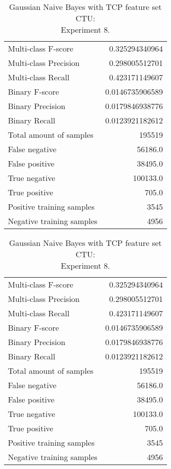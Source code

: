 \begin{table}[H]
\begin{minipage}{0.5\textwidth}
\caption{Gaussian Naive Bayes with TCP feature set CTU: \\Experiment 7.}
\centering
\begin{tabular}{l r}
\toprule
Multi-class F-score & 0.325294340964 \\
Multi-class Precision & 0.298005512701 \\
Multi-class Recall & 0.423171149607 \\
\midrule
Binary F-score & 0.0146735906589 \\
Binary Precision & 0.0179846938776 \\
Binary Recall & 0.0123921182612 \\
\midrule
Total amount of samples & 195519 \\
False negative & 56186.0 \\
False positive & 38495.0 \\
True negative & 100133.0 \\
True positive & 705.0 \\
\midrule
Positive training samples & 3545 \\
Negative training samples & 4956 \\
\bottomrule
\end{tabular}
\end{minipage}
\hfillx
\begin{minipage}{0.5\textwidth}
\caption{Gaussian Naive Bayes with TCP feature set CTU: \\Experiment 8.}
\centering
\begin{tabular}{l r}
\toprule
Multi-class F-score & 0.325294340964 \\
Multi-class Precision & 0.298005512701 \\
Multi-class Recall & 0.423171149607 \\
\midrule
Binary F-score & 0.0146735906589 \\
Binary Precision & 0.0179846938776 \\
Binary Recall & 0.0123921182612 \\
\midrule
Total amount of samples & 195519 \\
False negative & 56186.0 \\
False positive & 38495.0 \\
True negative & 100133.0 \\
True positive & 705.0 \\
\midrule
Positive training samples & 3545 \\
Negative training samples & 4956 \\
\bottomrule
\end{tabular}
\end{minipage}
\end{table}
